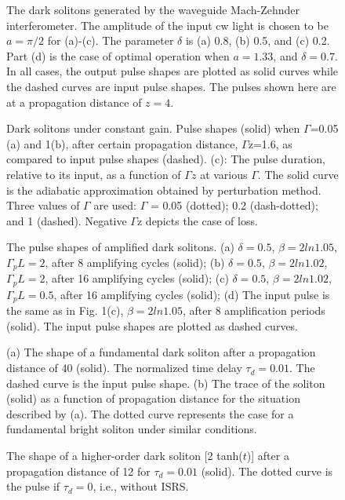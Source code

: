 \begin{figure}
\caption{The dark solitons generated by the waveguide
Mach-Zehnder interferometer.  The amplitude of the input cw
light is chosen to be $ a =  \pi /2 $ for (a)-(c).  The
parameter $ \delta $ is (a) 0.8, (b) 0.5, and (c) 0.2.  Part (d) is the case
of optimal operation when $ a =  1.33 $, and $ \delta  =  0.7 $.  In all
cases, the output pulse shapes are plotted as solid curves while
the dashed curves are input pulse shapes.  The pulses shown here are at a
propagation distance of $ z  =  4 $.}
\end{figure}
\begin{figure}
\caption{ Dark solitons under constant gain.  Pulse shapes (solid) when
$\Gamma$=0.05 (a) and 1(b), after certain propagation distance,
$\Gamma$z=1.6, as compared to input pulse shapes (dashed). (c): The pulse
duration, relative to its input,  as a function of $\Gamma z$ at various
$\Gamma$. The solid curve is the adiabatic approximation obtained by
perturbation method. Three values of $\Gamma$ are used: $\Gamma$ = 0.05
(dotted); 0.2 (dash-dotted); and 1 (dashed). Negative $\Gamma$z depicts the
case of loss.}
\end{figure}
\begin{figure}
\caption{ The pulse shapes of amplified dark solitons. (a) $ \delta  =  0.5
$, $ \beta  =  2 ln 1.05 $, $ \Gamma_p L  =  2 $, after 8 amplifying cycles
(solid); (b) $ \delta  =  0.5 $, $ \beta  =  2 ln 1.02 $, $ \Gamma_p L  =
2 $, after 16 amplifying cycles (solid); (c) $ \delta  =  0.5 $, $ \beta  =
2 ln 1.02 $, $ \Gamma_p L  =  0.5 $, after 16 amplifying cycles (solid);
(d) The input pulse is the same as in Fig. 1(c), $ \beta  =  2 ln 1.05 $,
after 8 amplification periods (solid).  The input pulse shapes are plotted
as dashed curves.}
\end{figure}
\begin{figure}
\caption{
(a) The shape of a fundamental dark soliton after a propagation distance of
40 (solid). The normalized time delay $ \tau_d  =  0.01 $.  The dashed
curve is the input pulse shape. (b) The trace of the soliton (solid) as a
function of propagation distance for the situation described by (a). The
dotted curve represents the case for a fundamental bright soliton under
similar conditions.}
\end{figure}
\begin{figure}
\caption{
The shape of a higher-order dark soliton [2 tanh($t$)] after a propagation
distance of 12 for $ \tau_d  =  0.01 $ (solid).  The dotted curve is the
pulse if $ \tau_d  =  0 $, i.e., without ISRS.}
\end{figure}
